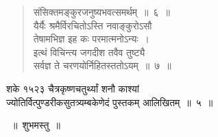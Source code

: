 \documentclass[11pt, openany]{book}
\begin{document}
\begin{quote}
\vspace{-7mm}
\hspace{1cm} संसिक्तमङ्कुरजनुष्यभवत्समर्थम्~॥~६~॥\\

\vspace{-5mm}
 यैर्यैः श्रमैर्विरचितोऽस्ति नवाङ्कुरोऽसौ \\

\vspace{-7mm}
\hspace{1cm} तेषामभिज्ञ इह कः परमात्मनोऽन्यः~। \\

\vspace{-7mm}
 इत्थं विचिन्त्य जगदीश तवैव तुष्ट्यै \\

\vspace{-7mm}
\hspace{1cm} सर्वज्ञ ते चरणयोर्निहितस्ततोऽयम्~॥~७~॥
 \end{quote}
\begin{center}
 शके १५२३ चैत्रकृष्णचतुर्थ्यां शनौ काश्यां \\
 ज्योतिर्वित्पुण्डरीकसुतत्र्यम्बकेणेदं पुस्तकम् आलिखितम्~॥~५~॥\\
\vspace{5mm}
 
    ~॥~शुभमस्तु~॥~
\end{center}

 
\end{document}

